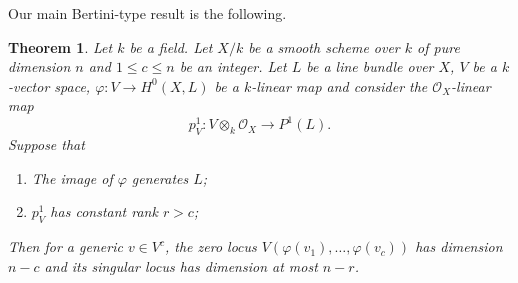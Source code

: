 \documentclass[a4paper,12pt]{amsart}
\newtheorem{theorem}[definition]{Theorem}
\numberwithin{equation}{section}
\renewcommand{\leq}{\leqslant}
\renewcommand{\_}{\rule{0.25cm}{0.4pt}}
\begin{document}
Our main Bertini-type result is the following.

\begin{theorem}\label{Bertini}
    Let $k$ be a field. Let $X/k$ be a smooth scheme over $k$ of pure dimension $n$ and $1\leq c\leq n$ be an integer. Let $L$ be a line bundle over $X$, $V$ be a $k$-vector space, $\varphi\colon V\to H^{0}(X,L)$ be a $k$-linear map and consider the $\mathcal{O}_{X}$-linear map
    \[
    p^{1}_{V}\colon V\otimes_{k}\mathcal{O}_{X}\to P^{1}(L).
    \]
    Suppose that
    \begin{enumerate}
        \item The image of $\varphi$ generates $L$;
        \item $p^{1}_{V}$ has constant rank $r>c$;
    \end{enumerate}
    Then for a generic $v\in V^{c}$, the zero locus $V(\varphi(v_{1}),\dots, \varphi(v_{c}))$ has dimension $n-c$ and its singular locus has dimension at most $n-r$.
\end{theorem}
\end{document}
